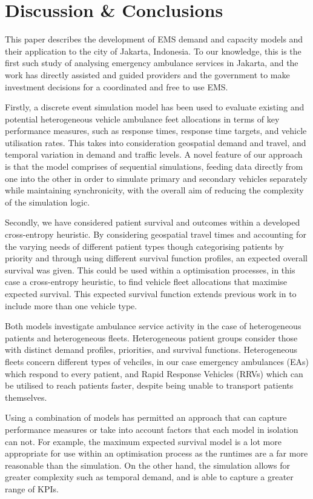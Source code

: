 \documentclass[preprint,12pt]{elsarticle}
\begin{document}
\section{Discussion \& Conclusions}\label{sec:discussion}
This paper describes the development of EMS demand and capacity models and their application to the city of Jakarta, Indonesia. To our knowledge, this is the first such study of analysing emergency ambulance services in Jakarta, and the work has directly assisted and guided providers and the government to make investment decisions for a coordinated and free to use EMS.

Firstly, a discrete event simulation model has been used to evaluate existing and potential heterogeneous vehicle ambulance feet allocations in terms of key performance measures, such as response times, response time targets, and vehicle utilisation rates. This takes into consideration geospatial demand and travel, and temporal variation in demand and traffic levels. A novel feature of our approach is that the model comprises of sequential simulations, feeding data directly from one into the other in order to simulate primary and secondary vehicles separately while maintaining synchronicity, with the overall aim of reducing the complexity of the simulation logic.

Secondly, we have considered patient survival and outcomes within a developed cross-entropy heuristic. By considering geospatial travel times and accounting for the varying needs of different patient types though categorising patients by priority and through using different survival function profiles, an expected overall survival was given. This could be used within a optimisation processes, in this case a cross-entropy heuristic, to find vehicle fleet allocations that maximise expected survival. This expected survival function extends previous work in \cite{Knight2012918} to include more than one vehicle type.

Both models investigate ambulance service activity in the case of heterogeneous patients and heterogeneous fleets. Heterogeneous patient groups consider those with distinct demand profiles, priorities, and survival functions. Heterogeneous fleets concern different types of vehciles, in our case emergency ambulances (EAs) which respond to every patient, and Rapid Response Vehicles (RRVs) which can be utilised to reach patients faster, despite being unable to transport patients themselves.

Using a combination of models has permitted an approach that can capture performance measures or take into account factors that each model in isolation can not. For example, the maximum expected survival model is a lot more appropriate for use within an optimisation process as the runtimes are a far more reasonable than the simulation. On the other hand, the simulation allows for greater complexity such as temporal demand, and is able to capture a greater range of KPIs.
\end{document}
